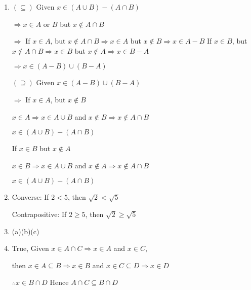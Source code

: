 \begin{enumerate}
	\newpage	
	
	\item 
	
	$(\subseteq)$ Given $x \in (A \cup B) - (A \cap B)$
	
	$\Rightarrow x \in A$ or $B$ but $x \notin A \cap B$
	
	$\Rightarrow$ If $x \in A$, but $x \notin A \cap B \Rightarrow x \in A $ but $ x \notin B \Rightarrow x \in A -B$
	If $x \in B$, but $x \notin A \cap B \Rightarrow x \in B$ but $x \notin A \Rightarrow x \in B - A$
	
	$\Rightarrow x \in (A - B) \cup (B - A)$
	
	$(\supseteq)$ Given $x \in (A - B) \cup (B - A)$
	
	$\Rightarrow$ If $x \in A$, but $x \notin B$
	
	$x \in A \Rightarrow x \in A \cup B$ and $x \notin B \Rightarrow x \notin A \cap B$
	
	$x \in (A \cup B) - (A \cap B)$
	
	If $x \in B$ but $x \notin A$
	
	$x \in B \Rightarrow x \in A \cup B$ and $x \notin A \Rightarrow x \notin A \cap B$
	
	$x \in (A \cup B) - (A \cap B)$
	
	\item Converse: If $2 < 5$, then $\sqrt{2} < \sqrt{5}$
	
	Contrapositive: If $2 \geq 5$, then $\sqrt{2} \geq \sqrt{5}$
	
	\item (a)(b)(c)
	\item True, Given $x \in A \cap C \Rightarrow x \in A$ and $x \in C$,
	
	then $x \in A \subseteq B \Rightarrow x \in B$ and $x \in C \subseteq D \Rightarrow x \in D$
	
	$\therefore	 x \in B \cap D$ Hence $A \cap C \subseteq B \cap D$


\end{enumerate}






